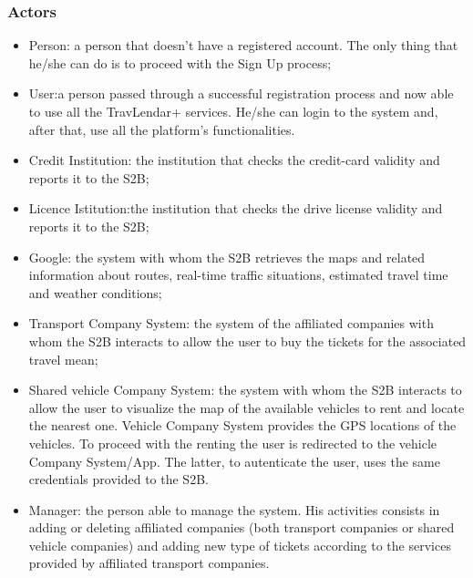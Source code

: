 	\subsubsection{Actors}
			\begin{itemize}
			\item Person: a person that doesn't have a registered account. The only thing that he/she can do is to proceed with the Sign Up process;
			\item User:a person passed through a successful registration process and now
			able to use all the TravLendar+ services. He/she can login to the system and, after that, use all
			the platform's functionalities.
			\item Credit Institution: the institution that checks the credit-card validity and reports it to the S2B;
			\item Licence Istitution:the institution that checks the drive license validity and reports it to the S2B;
			\item Google: the system with whom the S2B retrieves the maps and related information about routes, real-time traffic situations, estimated travel time and weather conditions;
			\item Transport Company System: the system of the affiliated companies with whom the S2B interacts to allow the user to buy the tickets for the associated travel mean;
			\item Shared vehicle Company System: the system with whom the S2B interacts to allow the user to visualize the map of the available vehicles to rent and locate the nearest one. Vehicle Company System provides the GPS locations of the vehicles. To proceed with the renting the user is redirected to the vehicle Company System/App. The latter, to autenticate the user, uses the same credentials provided to the S2B.
			\item Manager: the person able to manage the system. His activities consists in adding or deleting affiliated companies (both  transport companies or shared vehicle companies) and adding new type of tickets according to the services provided by affiliated transport companies.
		\end{itemize}
